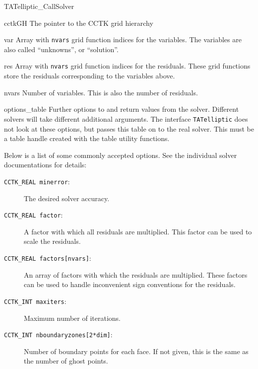 \begin{FunctionDescription}{TATelliptic\_CallSolver}
\begin{ParameterSection}
\begin{Parameter}{cctkGH}
The pointer to the CCTK grid hierarchy
\end{Parameter}
\begin{Parameter}{var}
Array with \texttt{nvars} grid function indices for the variables.
The variables are also called ``unknowns'', or ``solution''.
\end{Parameter}
\begin{Parameter}{res}
Array with \texttt{nvars} grid function indices for the residuals.
These grid functions store the residuals corresponding to the
variables above.
\end{Parameter}
\begin{Parameter}{nvars}
Number of variables.  This is also the number of residuals.
\end{Parameter}
\begin{Parameter}{options\_table}
Further options to and return values from the solver.  Different
solvers will take different additional arguments.  The interface
\texttt{TATelliptic} does not look at these options, but passes this
table on to the real solver.  This must be a table handle created with
the table utility functions.

Below is a list of some commonly accepted options.  See the individual
solver documentations for details:
\begin{description}
\item[\texttt{CCTK\_REAL minerror}:] The desired solver accuracy.
\item[\texttt{CCTK\_REAL factor}:] A factor with which all residuals
are multiplied.  This factor can be used to scale the residuals.
\item[\texttt{CCTK\_REAL factors[nvars]}:] An array of factors with
which the residuals are multiplied.  These factors can be used to
handle inconvenient sign conventions for the residuals.
\item[\texttt{CCTK\_INT maxiters}:] Maximum number of iterations.
\item[\texttt{CCTK\_INT nboundaryzones[2*dim]}:] Number of boundary points
for each face.  If not given, this is the same as the number of ghost
points.
\end{description}


\end{Parameter}
\end{ParameterSection}
\end{FunctionDescription}
